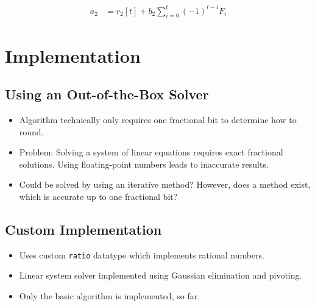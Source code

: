 \documentclass[english,version-2020-11]{uzl-thesis}
\begin{document}
\begin{align*}
  a_2 & = r_2[t] + b_2 \sum_{i=0}^t (-1)^{t-i} F_i
\end{align*}

\chapter{Implementation}

\section{Using an Out-of-the-Box Solver}

\begin{itemize}
  \item Algorithm technically only requires one fractional bit to determine how to round.
  \item Problem: Solving a system of linear equations requires exact fractional solutions.
    Using floating-point numbers leads to inaccurate results.
  \item Could be solved by using an iterative method? However, does a method
    exist, which is accurate up to one fractional bit?
\end{itemize}

\section{Custom Implementation}

\begin{itemize}
  \item Uses custom \texttt{ratio} datatype which implements rational numbers.
  \item Linear system solver implemented using Gaussian elimination and pivoting.
  \item Only the basic algorithm is implemented, so far.
\end{itemize}

\begin{bibtex-entries}
\end{bibtex-entries}
\end{document}
